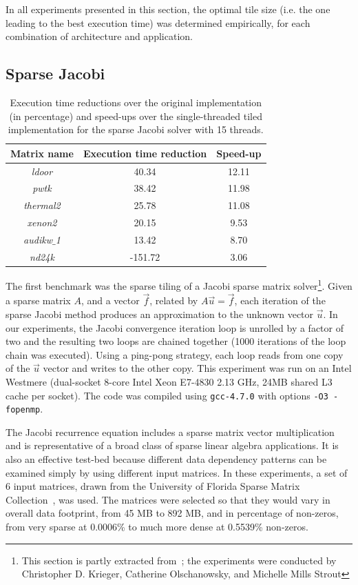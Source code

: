 In all experiments presented in this section, the optimal tile size (i.e. the one leading to the best execution time) was determined empirically, for each combination of architecture and application. 

\subsection{Sparse Jacobi}

\begin{table}[t]
\centering
\begin{tabulary}{1.0\columnwidth}{c | c | c}
\hline
Matrix name & Execution time reduction & Speed-up  \\
\hline \hline
{\em ldoor} & 40.34 & 12.11 \\
{\em pwtk} & 38.42 & 11.98 \\
{\em thermal2} & 25.78 & 11.08 \\
{\em xenon2} & 20.15 & 9.53 \\
{\em audikw$\_$1} & 13.42 & 8.70 \\
{\em nd24k} & -151.72 & 3.06 \\
\hline
\end{tabulary}
\caption{Execution time reductions over the original implementation (in percentage) and speed-ups over the single-threaded tiled implementation for the sparse Jacobi solver with 15 threads.}
\label{table:st-jacobi}
\end{table}

The first benchmark was the sparse tiling of a Jacobi sparse matrix solver\footnote{This section is partly extracted from~\cite{st-paper}; the experiments were conducted by Christopher D. Krieger, Catherine Olschanowsky, and Michelle Mills Strout}. Given a sparse matrix $A$, and a vector $\vec{f}$, related by $A\vec{u}=\vec{f}$, each iteration of the sparse Jacobi method produces an approximation to the unknown vector $\vec{u}$. In our experiments, the Jacobi convergence iteration loop is unrolled by a factor of two and the resulting two loops are chained together (1000 iterations of the loop chain was executed). Using a ping-pong strategy, each loop reads from one copy of the $\vec{u}$ vector and writes to the other copy. This experiment was run on an Intel Westmere (dual-socket 8-core Intel Xeon E7-4830 2.13 GHz, 24MB shared L3 cache per socket). The code was compiled using {\tt gcc-4.7.0} with options {\tt -O3 -fopenmp}.

The Jacobi recurrence equation includes a sparse matrix vector multiplication and is representative of a broad class of sparse linear algebra applications. It is also an effective test-bed because different data dependency patterns can be examined simply by using different input matrices. In these experiments, a set of 6 input matrices, drawn from the University of Florida Sparse Matrix Collection~\citep{ST-MatrixMarket}, was used. The matrices were selected so that they would vary in overall data footprint, from 45 MB to 892 MB, and in percentage of non-zeros, from very sparse at 0.0006\% to much more dense at 0.5539\% non-zeros. %

